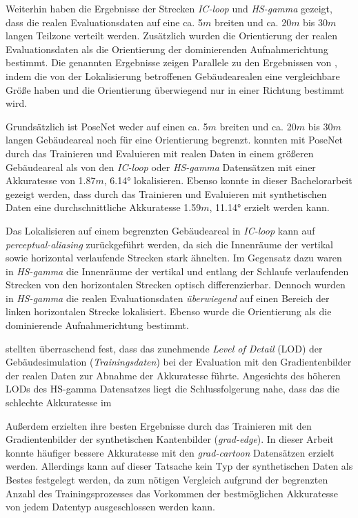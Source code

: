 Weiterhin haben die Ergebnisse der Strecken \textit{IC-loop} und \textit{HS-gamma} gezeigt, dass die realen Evaluationsdaten auf eine ca. 5$m$ breiten und ca. 20$m$ bis 30$m$ langen Teilzone verteilt werden. Zusätzlich wurden die Orientierung der realen Evaluationsdaten als die Orientierung der dominierenden Aufnahmerichtung bestimmt. Die genannten Ergebnisse zeigen Parallele zu den Ergebnissen von \citet{acharyaBIMPoseNetIndoorCamera2019}, indem die von der Lokalisierung betroffenen Gebäudearealen eine vergleichbare Größe haben und die Orientierung überwiegend nur in einer Richtung bestimmt wird.

Grundsätzlich ist PoseNet weder auf einen ca. 5$m$ breiten und ca. 20$m$ bis 30$m$ langen Gebäudeareal noch für eine Orientierung begrenzt. \citet{walchImageBasedLocalizationUsing2017} konnten mit PoseNet durch das Trainieren und Evaluieren mit realen Daten in einem größeren Gebäudeareal als von den \textit{IC-loop} oder \textit{HS-gamma} Datensätzen mit einer Akkuratesse von 1.87$m$, 6.14° lokalisieren. Ebenso konnte in dieser Bachelorarbeit gezeigt werden, dass durch das Trainieren und Evaluieren mit synthetischen Daten eine durchschnittliche Akkuratesse 1.59$m$, 11.14° erzielt werden kann.


Das Lokalisieren auf einem begrenzten Gebäudeareal in \textit{IC-loop} kann auf \textit{perceptual-aliasing} zurückgeführt werden, da sich die Innenräume der vertikal sowie horizontal verlaufende Strecken stark ähnelten. Im Gegensatz dazu waren in \textit{HS-gamma} die Innenräume der vertikal und entlang der Schlaufe verlaufenden Strecken von den horizontalen Strecken optisch differenzierbar. Dennoch wurden in \textit{HS-gamma} die realen Evaluationsdaten \textit{überwiegend} auf einen Bereich der linken horizontalen Strecke lokalisiert. Ebenso wurde die Orientierung als die dominierende Aufnahmerichtung bestimmt.


\citet{acharyaBIMPoseNetIndoorCamera2019} stellten überraschend fest, dass das zunehmende \textit{Level of Detail} (LOD) der Gebäudesimulation (\textit{Trainingsdaten}) bei der Evaluation mit den Gradientenbilder der realen Daten zur Abnahme der Akkuratesse führte. Angesichts des höheren LODs des HS-gamma Datensatzes liegt die Schlussfolgerung nahe, dass das die schlechte Akkuratesse im 

Außerdem erzielten \citet{acharyaBIMPoseNetIndoorCamera2019} ihre besten Ergebnisse durch das Trainieren mit den Gradientenbilder der synthetischen Kantenbilder (\textit{grad-edge}). In dieser Arbeit konnte häufiger bessere Akkuratesse  mit den \textit{grad-cartoon} Datensätzen erzielt werden. Allerdings kann auf dieser Tatsache kein Typ der synthetischen Daten als Bestes festgelegt werden, da zum nötigen Vergleich aufgrund der begrenzten Anzahl des Trainingsprozesses das Vorkommen der bestmöglichen Akkuratesse von jedem Datentyp ausgeschlossen werden kann. 
 

